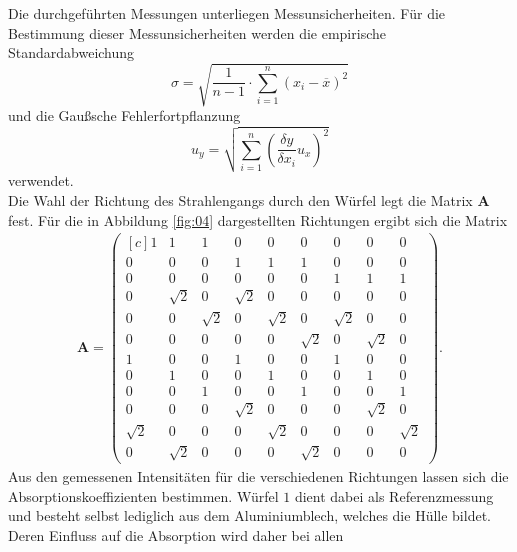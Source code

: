 Die durchgeführten Messungen unterliegen Messunsicherheiten. Für die Bestimmung
dieser Messunsicherheiten werden die empirische Standardabweichung
\begin{equation}
  \sigma = \sqrt{\frac{1}{n-1} \cdot \sum_{i=1}^n(x_i-\overline{x})^2}
  \label{eqn:Stdabweichung}
\end{equation}
und die Gaußsche Fehlerfortpflanzung
\begin{equation}
  u_y = \sqrt{\sum_{i=1}^n\left(\frac{\delta y}{\delta x_i}u_x\right)^2}
  \label{eqn:gauß}
\end{equation}
verwendet. \\
\newline
\noindent Die Wahl der Richtung des Strahlengangs durch den Würfel legt die
Matrix $\textbf{A}$ fest. Für die in Abbildung \ref{fig:04} dargestellten
Richtungen ergibt sich die Matrix
\begin{align}
  \textbf{A} = \begin{pmatrix*}[c]
                 1 & 1 & 1 & 0 & 0 & 0 & 0 & 0 & 0 \\
                 0 & 0 & 0 & 1 & 1 & 1 & 0 & 0 & 0 \\
                 0 & 0 & 0 & 0 & 0 & 0 & 1 & 1 & 1 \\
                 0 & \sqrt{2} & 0 & \sqrt{2} & 0 & 0 & 0 & 0 & 0 \\
                 0 & 0 & \sqrt{2} & 0 & \sqrt{2} & 0 & \sqrt{2} & 0 & 0 \\
                 0 & 0 & 0 & 0 & 0 & \sqrt{2} & 0 & \sqrt{2} & 0 \\
                 1 & 0 & 0 & 1 & 0 & 0 & 1 & 0 & 0 \\
                 0 & 1 & 0 & 0 & 1 & 0 & 0 & 1 & 0 \\
                 0 & 0 & 1 & 0 & 0 & 1 & 0 & 0 & 1 \\
                 0 & 0 & 0 & \sqrt{2} & 0 & 0 & 0 & \sqrt{2} & 0 \\
                 \sqrt{2} & 0 & 0 & 0 & \sqrt{2} & 0 & 0 & 0 & \sqrt{2} \\
                 0 & \sqrt{2} & 0 & 0 & 0 & \sqrt{2} & 0 & 0 & 0
               \end{pmatrix*}.
\end{align}
\noindent Aus den gemessenen Intensitäten für die verschiedenen Richtungen
lassen sich die Absorptionskoeffizienten bestimmen. Würfel $1$ dient dabei
als Referenzmessung und besteht selbst lediglich aus dem Aluminiumblech, welches
die Hülle bildet. Deren Einfluss auf die Absorption wird daher bei allen
